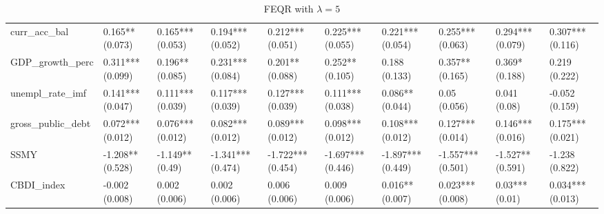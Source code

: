 \begin{table}[H]
\begin{subtable}[c]{\textwidth}
{\begin{tabular}{llllllllll}
  curr\_acc\_bal & 0.165** (0.073) & 0.165*** (0.053) & 0.194*** (0.052) & 0.212*** (0.051) & 0.225*** (0.055) & 0.221*** (0.054) & 0.255*** (0.063) & 0.294*** (0.079) & 0.307*** (0.116) \\ 
  GDP\_growth\_perc & 0.311*** (0.099) & 0.196** (0.085) & 0.231*** (0.084) & 0.201** (0.088) & 0.252** (0.105) & 0.188 (0.133) & 0.357** (0.165) & 0.369* (0.188) & 0.219 (0.222) \\ 
  unempl\_rate\_imf & 0.141*** (0.047) & 0.111*** (0.039) & 0.117*** (0.039) & 0.127*** (0.039) & 0.111*** (0.038) & 0.086** (0.044) & 0.05 (0.056) & 0.041 (0.08) & -0.052 (0.159) \\ 
  gross\_public\_debt & 0.072*** (0.012) & 0.076*** (0.012) & 0.082*** (0.012) & 0.089*** (0.012) & 0.098*** (0.012) & 0.108*** (0.012) & 0.127*** (0.014) & 0.146*** (0.016) & 0.175*** (0.021) \\ 
  SSMY & -1.208** (0.528) & -1.149** (0.49) & -1.341*** (0.474) & -1.722*** (0.454) & -1.697*** (0.446) & -1.897*** (0.449) & -1.557*** (0.501) & -1.527** (0.591) & -1.238 (0.822) \\ 
  CBDI\_index & -0.002 (0.008) & 0.002 (0.006) & 0.002 (0.006) & 0.006 (0.006) & 0.009 (0.006) & 0.016** (0.007) & 0.023*** (0.008) & 0.03*** (0.01) & 0.034*** (0.013) \\ 
   \bottomrule
\end{tabular}}
\end{subtable}
\\
\begin{subtable}[c]{\textwidth}
\caption{FEQR with $\lambda = 5$}
\centering
{}
\end{subtable}
\end{table}
